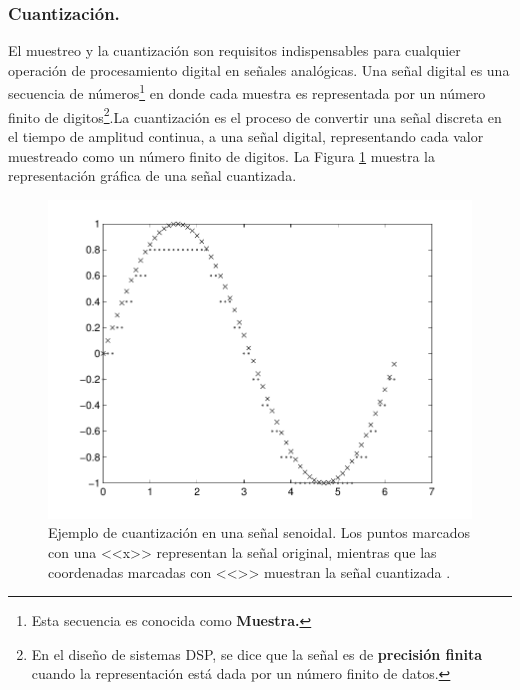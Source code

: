 \subsubsection{Cuantizaci\'{o}n.}

El muestreo y la cuantizaci\'{o}n son requisitos indispensables para
cualquier operaci\'{o}n de procesamiento digital en se\~{n}ales anal\'{o}gicas.
Una se\~{n}al digital es una secuencia de n\'{u}meros\footnote{Esta secuencia es conocida como \textbf{Muestra.}}
en donde cada muestra es representada por un n\'{u}mero finito de
digitos\footnote{En el dise\~{n}o de sistemas DSP, se dice que la se\~{n}al es de \textbf{precisi\'{o}n
finita} cuando la representaci\'{o}n est\'{a} dada por un n\'{u}mero
finito de datos.}.La cuantizaci\'{o}n es el proceso de convertir una se\~{n}al discreta
en el tiempo de amplitud continua, a una se\~{n}al digital, representando
cada valor muestreado como un n\'{u}mero finito de digitos. La Figura
\ref{fig:Ejemplo-de-cuantizaci=0000F3n} muestra la representaci\'{o}n
gr\'{a}fica de una se\~{n}al cuantizada.

\begin{figure}[H]
\begin{centering}
\includegraphics[scale=0.5]{img/quantization_example}
\par\end{centering}
\caption{Ejemplo de cuantizaci\'{o}n en una se\~{n}al senoidal. Los puntos
marcados con una <<x>> representan la se\~{n}al original, mientras
que las coordenadas marcadas con <<\textendash >> muestran la se\~{n}al
cuantizada \label{fig:Ejemplo-de-cuantizaci=0000F3n}.}

\end{figure}

